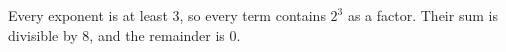 Every exponent is at least 3, so every term contains $2^3$ as a factor. Their sum is divisible by 8, and the remainder is $\boxed0$.

